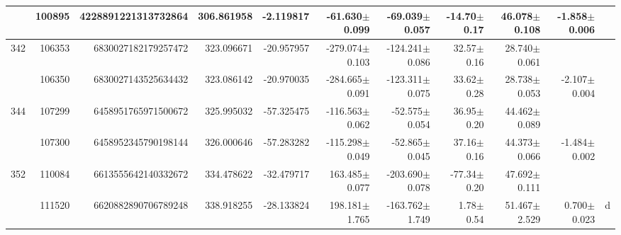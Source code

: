 \documentclass{ws-ijmpd}
\begin{document}
\begin{landscape}
\begin{longtable}{rrrrrrrrrrl}
            &  100895 &      4228891221313732864 &                   306.861958 &                    -2.119817 &                -61.630$\pm$0.099 &                -69.039$\pm$0.057 &         -14.70$\pm$  0.17 &        46.078$\pm$0.108 &                          -1.858$\pm$0.006 &                                                    \\
 \hline 342 &  106353 &      6830027182179257472 &                   323.096671 &                   -20.957957 &               -279.074$\pm$0.103 &               -124.241$\pm$0.086 &          32.57$\pm$  0.16 &        28.740$\pm$0.061 &                                           &                                                    \\
            &  106350 &      6830027143525634432 &                   323.086142 &                   -20.970035 &               -284.665$\pm$0.091 &               -123.311$\pm$0.075 &          33.62$\pm$  0.28 &        28.738$\pm$0.053 &                          -2.107$\pm$0.004 &                                                    \\
 \hline 344 &  107299 &      6458951765971500672 &                   325.995032 &                   -57.325475 &               -116.563$\pm$0.062 &                -52.575$\pm$0.054 &          36.95$\pm$  0.20 &        44.462$\pm$0.089 &                                           &                                                    \\
            &  107300 &      6458952345790198144 &                   326.000646 &                   -57.283282 &               -115.298$\pm$0.049 &                -52.865$\pm$0.045 &          37.16$\pm$  0.16 &        44.373$\pm$0.066 &                          -1.484$\pm$0.002 &                                                    \\
 \hline 352 &  110084 &      6613555642140332672 &                   334.478622 &                   -32.479717 &                163.485$\pm$0.077 &               -203.690$\pm$0.078 &         -77.34$\pm$  0.20 &        47.692$\pm$0.111 &                                           &                                                    \\
            &  111520 &      6620882890706789248 &                   338.918255 &                   -28.133824 &                198.181$\pm$1.765 &               -163.762$\pm$1.749 &           1.78$\pm$  0.54 &        51.467$\pm$2.529 &                           0.700$\pm$0.023 &                                                  d \\

\end{longtable}
\end{landscape}
\end{document}
